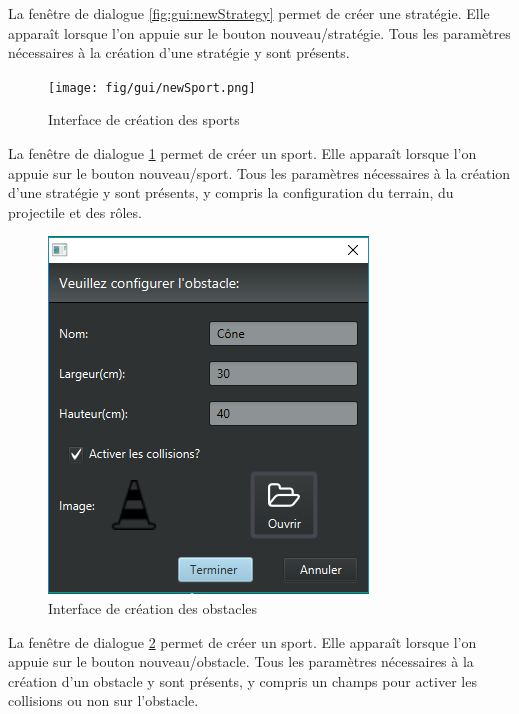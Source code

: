 La fenêtre de dialogue \ref{fig:gui:newStrategy} permet de créer une stratégie.
Elle apparaît lorsque l'on appuie sur le bouton nouveau/stratégie.
Tous les paramètres nécessaires à la création d'une stratégie y sont présents.

\begin{figure}[htpb]
    \centering
    \texttt{[image: fig/gui/newSport.png]}
    \caption{Interface de création des sports}
    \label{fig:gui:newSport}
\end{figure}

La fenêtre de dialogue \ref{fig:gui:newSport} permet de créer un sport.
Elle apparaît lorsque l'on appuie sur le bouton nouveau/sport.
Tous les paramètres nécessaires à la création d'une stratégie y sont présents, y compris la configuration du terrain, du projectile et des rôles.

\newpage

\begin{figure}[htpb]
    \centering
    \includegraphics[scale=0.6]{fig/gui/newObstacle.png}
    \caption{Interface de création des obstacles}
    \label{fig:gui:newObstacle}
\end{figure}

La fenêtre de dialogue \ref{fig:gui:newObstacle} permet de créer un sport.
Elle apparaît lorsque l'on appuie sur le bouton nouveau/obstacle.
Tous les paramètres nécessaires à la création d'un obstacle y sont présents, y compris un champs pour activer les collisions ou non sur l'obstacle.

\newpage